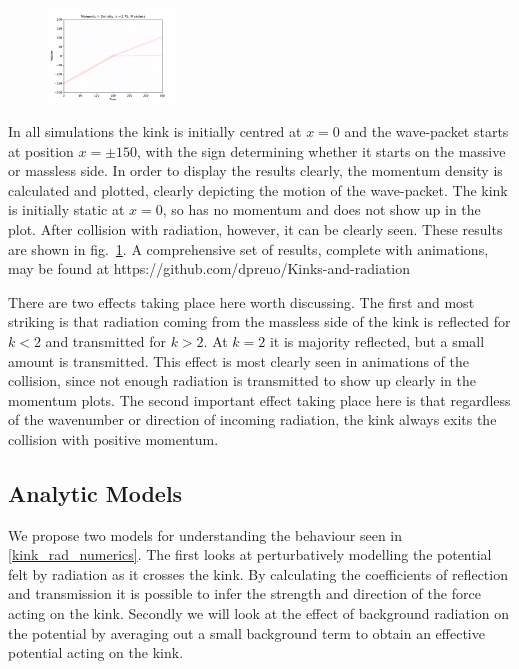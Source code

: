 \documentclass[11pt, oneside,titlepage]{article}  	%
\numberwithin{equation}{section}
\begin{document}
\begin{figure}
\includegraphics[width=0.3\textwidth]{MomentumDensityk275Massless.pdf}
 \label{radiation_results}
\end{figure}
In all simulations the kink is initially centred at $x=0$ and the wave-packet starts at position $x=\pm150$, with the sign determining whether it starts on the massive or massless side. In order to display the results clearly, the momentum density is calculated and plotted, clearly depicting the motion of the wave-packet. The kink is initially static at $x=0$, so has no momentum and does not show up in the plot. After collision with radiation, however, it can be clearly seen. These results are shown in fig.~\ref{radiation_results}. A comprehensive set of results, complete with animations, may be found at https://github.com/dpreuo/Kinks-and-radiation\par
There are two effects taking place here worth discussing. The first and most striking is that radiation coming from the massless side of the kink is reflected for $k < 2$ and transmitted for $k>2$. At $k = 2$ it is majority reflected, but a small amount is transmitted. This effect is most clearly seen in animations of the collision, since not enough radiation is transmitted to show up clearly in the momentum plots. The second important effect taking place here is that regardless of the wavenumber or direction of incoming radiation, the kink always exits the collision with positive momentum. 

 \subsection{Analytic Models} \label{rad-anal}
 We propose two models for understanding the behaviour seen in \textsection \ref{kink_rad_numerics}. The first looks at perturbatively modelling the potential felt by radiation as it crosses the kink. By calculating the coefficients of reflection and transmission it is possible to infer the strength and direction of the force acting on the kink. Secondly we will look at the effect of background radiation on the potential by averaging out a small background term to obtain an effective potential acting on the kink.
\end{document}

